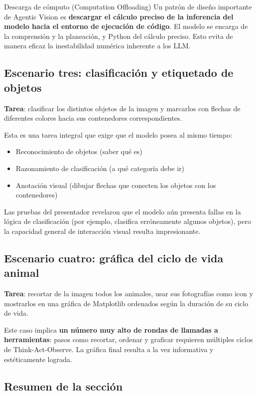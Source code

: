 \documentclass[a4paper]{article}
\begin{document}
\begin{importantbox}{Descarga de cómputo (Computation Offloading)}
Un patrón de diseño importante de Agentic Vision es \textbf{descargar el cálculo preciso de la inferencia del modelo hacia el entorno de ejecución de código}. El modelo se encarga de la comprensión y la planeación, y Python del cálculo preciso. Esto evita de manera eficaz la inestabilidad numérica inherente a los LLM.
\end{importantbox}

\subsection{Escenario tres: clasificación y etiquetado de objetos}

\textbf{Tarea}: clasificar los distintos objetos de la imagen y marcarlos con flechas de diferentes colores hacia sus contenedores correspondientes.

Esta es una tarea integral que exige que el modelo posea al mismo tiempo:
\begin{itemize}
    \item Reconocimiento de objetos (saber qué es)
    \item Razonamiento de clasificación (a qué categoría debe ir)
    \item Anotación visual (dibujar flechas que conecten los objetos con los contenedores)
\end{itemize}

Las pruebas del presentador revelaron que el modelo aún presenta fallas en la lógica de clasificación (por ejemplo, clasifica erróneamente algunos objetos), pero la capacidad general de interacción visual resulta impresionante.

\subsection{Escenario cuatro: gráfica del ciclo de vida animal}

\textbf{Tarea}: recortar de la imagen todos los animales, usar sus fotografías como icon y mostrarlos en una gráfica de Matplotlib ordenados según la duración de su ciclo de vida.

Este caso implica \textbf{un número muy alto de rondas de llamadas a herramientas}: pasos como recortar, ordenar y graficar requieren múltiples ciclos de Think-Act-Observe. La gráfica final resulta a la vez informativa y estéticamente lograda.

\subsection{Resumen de la sección}
\end{document}

